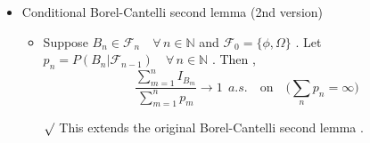 \documentclass[12pt, A4]{article}
\newcommand{\rmk}{$\surd$}
\newcommand{\N}{\mathbb{N}}
\newcommand{\F}{\mathcal{F}}
\newcommand{\foranyn}{\quad \forall \, n\in \N}
\begin{document}
\begin{itemize}
\begin{itemize}
\begin{enumerate}
\begin{itemize}
			\end{itemize}
		\end{enumerate}
	\end{itemize}
	\item Conditional Borel-Cantelli second lemma (2nd version)
	\begin{itemize}
		\item Suppose $B_n\in \F_n\foranyn$ and $\F_0=\{\phi, \Omega\}$ . Let $p_n=P(B_n|\F_{n-1})\foranyn$ . Then , $$ \frac{\sum_{m=1}^n I_{B_m}}{\sum_{m=1}^n p_m}\rightarrow 1 \;\,a.s. \quad \text{on}\quad \big(\sum_n p_n=\infty \big) $$
		\item[\rmk] This extends the original Borel-Cantelli second lemma . 
	\end{itemize}
\end{itemize}
\end{document}
